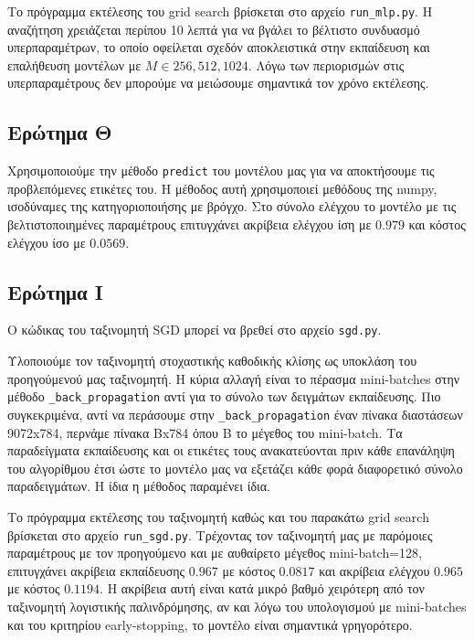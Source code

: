 \documentclass{article}
\newcommand{\code}{\texttt}
\begin{document}
Το πρόγραμμα εκτέλεσης του grid search βρίσκεται στο αρχείο \code{run\_mlp.py}. Η αναζήτηση χρειάζεται περίπου 10 λεπτά για να βγάλει το βέλτιστο συνδυασμό υπερπαραμέτρων, το οποίο οφείλεται σχεδόν αποκλειστικά στην εκπαίδευση και επαλήθευση μοντέλων με $M \in {256, 512, 1024}$. Λόγω των περιορισμών στις υπερπαραμέτρους δεν μπορούμε να μειώσουμε σημαντικά τον χρόνο εκτέλεσης.


\subsection{Ερώτημα Θ}

Χρησιμοποιούμε την μέθοδο \code{predict} του μοντέλου μας για να αποκτήσουμε τις προβλεπόμενες ετικέτες του. Η μέθοδος αυτή χρησιμοποιεί μεθόδους της numpy, ισοδύναμες της κατηγοριοποιήσης με βρόγχο. Στο σύνολο ελέγχου το μοντέλο με τις βελτιστοποιημένες παραμέτρους επιτυγχάνει ακρίβεια ελέγχου ίση με $0.979$ και κόστος ελέγχου ίσο με $0.0569$.

\subsection{Ερώτημα Ι}

Ο κώδικας του ταξινομητή SGD μπορεί να βρεθεί στο αρχείο \code{sgd.py}.

Υλοποιούμε τον ταξινομητή στοχαστικής καθοδικής κλίσης ως υποκλάση του προηγούμενού μας ταξινομητή. Η κύρια αλλαγή είναι το πέρασμα mini-batches στην μέθοδο \code{\_back\_propagation} αντί για το σύνολο των δειγμάτων εκπαίδευσης. Πιο συγκεκριμένα, αντί να περάσουμε στην \code{\_back\_propagation} έναν πίνακα διαστάσεων 9072x784, περνάμε πίνακα Βx784 όπου Β το μέγεθος του mini-batch. Τα παραδείγματα εκπαίδευσης και οι ετικέτες τους ανακατεύονται πριν κάθε επανάληψη του αλγορίθμου έτσι ώστε το μοντέλο μας να εξετάζει κάθε φορά διαφορετικό σύνολο παραδειγμάτων. Η ίδια η μέθοδος παραμένει ίδια.


 Το πρόγραμμα εκτέλεσης του ταξινομητή καθώς και του παρακάτω grid search βρίσκεται στο αρχείο \code{run\_sgd.py}. Τρέχοντας τον ταξινομητή μας με παρόμοιες παραμέτρους με τον προηγούμενο και με αυθαίρετο μέγεθος mini-batch=128, επιτυγχάνει ακρίβεια εκπαίδευσης $0.967$ με κόστος $0.0817$ και ακρίβεια ελέγχου $0.965$ με κόστος $0.1194$. Η ακρίβεια αυτή είναι κατά μικρό βαθμό χειρότερη από τον ταξινομητή λογιστικής παλινδρόμησης, αν και λόγω του υπολογισμού με mini-batches και του κριτηρίου early-stopping, το μοντέλο είναι σημαντικά γρηγορότερο.
 
\end{document}
